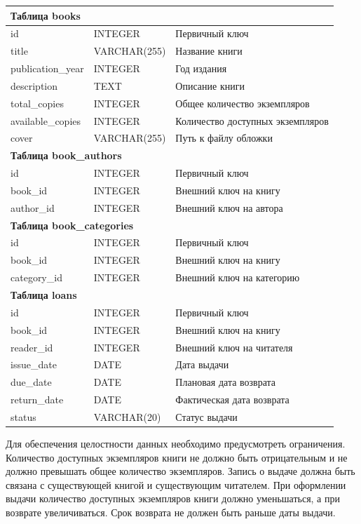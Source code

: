 {\begin{longtable}{|
p{}|
p{}|
p{}|}
    \multicolumn{3}{|l|}{\textbf{Таблица books}} \\ \hline
    id & INTEGER & Первичный ключ \\ \hline
    title & VARCHAR(255) & Название книги \\ \hline
    publication\_year & INTEGER & Год издания \\ \hline
    description & TEXT & Описание книги \\ \hline
    total\_copies & INTEGER & Общее количество экземпляров \\ \hline
    available\_copies & INTEGER & Количество доступных экземпляров \\ \hline
    cover & VARCHAR(255) & Путь к файлу обложки \\ \hline

    \multicolumn{3}{|l|}{\textbf{Таблица book\_authors}} \\ \hline
    id & INTEGER & Первичный ключ \\ \hline
    book\_id & INTEGER & Внешний ключ на книгу \\ \hline
    author\_id & INTEGER & Внешний ключ на автора \\ \hline

    \multicolumn{3}{|l|}{\textbf{Таблица book\_categories}} \\ \hline
    id & INTEGER & Первичный ключ \\ \hline
    book\_id & INTEGER & Внешний ключ на книгу \\ \hline
    category\_id & INTEGER & Внешний ключ на категорию \\ \hline

    \multicolumn{3}{|l|}{\textbf{Таблица loans}} \\ \hline
    id & INTEGER & Первичный ключ \\ \hline
    book\_id & INTEGER & Внешний ключ на книгу \\ \hline
    reader\_id & INTEGER & Внешний ключ на читателя \\ \hline
    issue\_date & DATE & Дата выдачи \\ \hline
    due\_date & DATE & Плановая дата возврата \\ \hline
    return\_date & DATE & Фактическая дата возврата \\ \hline
    status & VARCHAR(20) & Статус выдачи \\ \hline
\end{longtable}
}

Для обеспечения целостности данных необходимо предусмотреть ограничения. Количество
доступных экземпляров книги не должно быть отрицательным и не должно превышать
общее количество экземпляров. Запись о выдаче должна быть связана с существующей
книгой и существующим читателем. При оформлении выдачи количество доступных
экземпляров книги должно уменьшаться, а при возврате увеличиваться. Срок возврата
не должен быть раньше даты выдачи.

